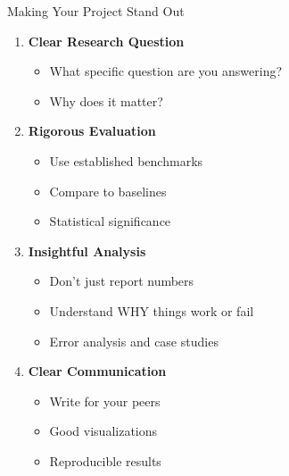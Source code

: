 \documentclass[aspectratio=169]{beamer}
\begin{document}
\begin{frame}[shrink=10]{Making Your Project Stand Out 🌟}
\begin{enumerate}\setlength{\itemsep}{0pt}
    \item \textbf{Clear Research Question}
    \begin{itemize}\setlength{\itemsep}{0pt}
        \item What specific question are you answering?
        \item Why does it matter?
    \end{itemize}

    \vspace{0.3em}

    \item \textbf{Rigorous Evaluation}
    \begin{itemize}\setlength{\itemsep}{0pt}
        \item Use established benchmarks
        \item Compare to baselines
        \item Statistical significance
    \end{itemize}

    \vspace{0.3em}

    \item \textbf{Insightful Analysis}
    \begin{itemize}\setlength{\itemsep}{0pt}
        \item Don't just report numbers
        \item Understand WHY things work or fail
        \item Error analysis and case studies
    \end{itemize}

    \vspace{0.3em}

    \item \textbf{Clear Communication}
    \begin{itemize}\setlength{\itemsep}{0pt}
        \item Write for your peers
        \item Good visualizations
        \item Reproducible results
    \end{itemize}
\end{enumerate}
\end{frame}
\end{document}
